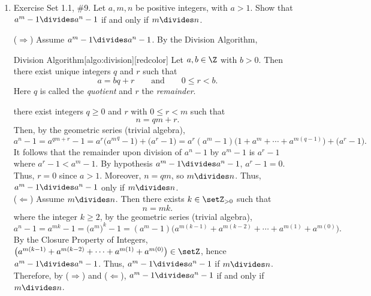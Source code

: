 \begin{enumerate}
  \newpage

  \item Exercise Set 1.1, \#9. Let $a, m, n$ be positive integers, with $a > 1$. Show that $a^{m}-1 \divides a^{n}-1$ if and only if $m\divides n$.
  \begin{subprove}
    ($\Rightarrow$) Assume $a^{m}-1\divides a^{n}-1$. By the Division Algorithm,
    \begin{define}{Division Algorithm}[algo:division][redcolor]
    Let $a,b\in\Z$ with $b>0$. Then there exist unique integers $q$ and $r$ such that
    \[
    a = b q + r \qquad\text{and}\qquad 0\le r < b.
    \]
    Here $q$ is called the \emph{quotient} and $r$ the \emph{remainder}.
    \end{define}
    there exist integers $q\ge 0$ and $r$ with $0\le r<m$ such that
    \[
      n = qm + r.
    \]
    Then, by the geometric series (trivial algebra),
    \[
      a^{n}-1 = a^{qm+r}-1 = a^{r}\bigl({a^{m}}^{q}-1\bigr) + \bigl(a^{r}-1\bigr)= a^{r}(a^{m}-1)\bigl(1+a^{m}+\cdots+a^{m(q-1)}\bigr) + \bigl(a^{r}-1\bigr).
    \]
    It follows that the remainder upon division of $a^{n}-1$ by $a^{m}-1$ is $a^{r}-1$ where $a^{r}-1 < a^{m}-1$. 
    By hypothesis 
    $a^{m}-1\divides a^{n}-1$, $a^{r}-1=0$. 
    Thus, $r=0$ since $a>1$. Moreover, $n=qm$, so $m\divides n$.
    Thus, $a^{m}-1 \divides a^{n}-1$ only if $m\divides n$.\vspace*{10px}\\
    ($\Leftarrow$) Assume $m\divides n$. Then there exists $k\in\setZ_{>0}$ such that
    \[
      n = m k.
    \]
    where the integer $k\ge 2$, by the geometric series (trivial algebra),
    \[
      a^{n}-1 = a^{mk}-1 = \bigl(a^{m}\bigr)^{k}-1
        = (a^{m}-1)\bigl(a^{m(k-1)}+a^{m(k-2)}+\cdots + a^{m(1)}+a^{m(0)}\bigr).
    \]
    By the Closure Property of Integers, $\bigl(a^{m(k-1)}+a^{m(k-2)}+\cdots + a^{m(1)}+a^{m(0)}\bigr)\in\setZ$, 
    hence $a^{m}-1\divides a^{n}-1$. 
    Thus, $a^{m}-1 \divides a^{n}-1$ if $m\divides n$.\vspace*{10px}\\
    Therefore, by ($\Rightarrow$) and ($\Leftarrow$), $a^{m}-1 \divides a^{n}-1$ if and only if $m\divides n$.
  \end{subprove}


  \newpage


\end{enumerate}
